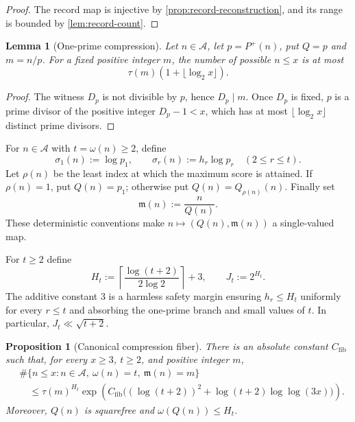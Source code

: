 \documentclass[11pt]{amsart}
\newtheorem{lemma}[lemma]{Lemma}
\newtheorem{proposition}[proposition]{Proposition}
\theoremstyle{definition}
\theoremstyle{remark}
\numberwithin{equation}{section}
\newcommand{\Acal}{\mathcal A}
\begin{document}
\begin{proof}
The record map is injective by \cref{prop:record-reconstruction}, and
its range is bounded by \cref{lem:record-count}.
\end{proof}

\begin{lemma}[One-prime compression]\label{lem:one-prime}
Let $n\in\Acal$, let $p=P^+(n)$, put $Q=p$ and $m=n/p$.  For a fixed positive integer $m$,
the number of possible $n\le x$ is at most
\[
 \tau(m)(1+\lfloor\log_2x\rfloor).
\]
\end{lemma}

\begin{proof}
The witness $D_p$ is not divisible by $p$, hence $D_p\mid m$.  Once
$D_p$ is fixed, $p$ is a prime divisor of the positive integer
$D_p-1<x$, which has at most $\lfloor\log_2x\rfloor$ distinct prime
divisors.
\end{proof}

For $n\in\Acal$ with $t=\omega(n)\ge2$, define
\[
 \sigma_1(n):=\log p_1,
 \qquad \sigma_r(n):=h_r\log p_r\quad(2\le r\le t).
\]
Let $\rho(n)$ be the least index at which the maximum score is attained.
If $\rho(n)=1$, put $Q(n)=p_1$; otherwise put
$Q(n)=Q_{\rho(n)}(n)$.  Finally set
\[
 \mathfrak m(n):=\frac{n}{Q(n)}.
\]
These deterministic conventions make $n\mapsto(Q(n),\mathfrak m(n))$
a single-valued map.

For $t\ge2$ define
\begin{equation}\label{eq:Ht-Jt}
 H_t:=\left\lceil\frac{\log(t+2)}{2\log 2}\right\rceil+3,
 \qquad J_t:=2^{H_t}.
\end{equation}
The additive constant $3$ is a harmless safety margin ensuring
$h_r\le H_t$ uniformly for every $r\le t$ and absorbing the one-prime
branch and small values of $t$.  In particular, $J_t\ll\sqrt{t+2}$.

\begin{proposition}[Canonical compression fiber]\label{prop:canonical-fiber}
There is an absolute constant $C_{\mathrm{fib}}$ such that, for every $x\ge3$,
$t\ge2$, and positive integer $m$,
\begin{align*}
 &\#\{n\le x:n\in\Acal,\ \omega(n)=t,\ \mathfrak m(n)=m\}\\
 &\quad\le\tau(m)^{H_t}
 \exp\!\left(C_{\mathrm{fib}}\bigl((\log(t+2))^2+
 \log(t+2)\log\log(3x)\bigr)\right).
\end{align*}
Moreover, $Q(n)$ is squarefree and $\omega(Q(n))\le H_t$.
\end{proposition}
\end{document}
